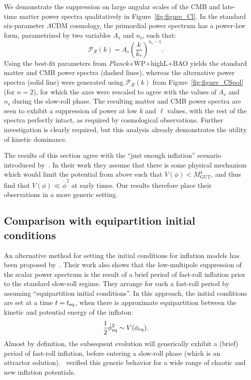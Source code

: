 We demonstrate the suppression on large angular scales of the CMB and late-time matter power spectra qualitatively in Figure~\ref{fig:figure_Cl}.  In the standard six-parameter \(\Lambda\)CDM cosmology, the primordial power spectrum has a power-law form, parametrized by two variables \(A_s\) and \(n_\mathrm{s}\), such that:
%
\begin{equation}
  \mathcal{P}_\mathcal{R}(k) = A_s{\left(\frac{k}{k_*}\right)}^{n_\mathrm{s}-1}.
\end{equation}
%
Using the best-fit parameters from {\em Planck\/}+WP+highL+BAO \citep{planck_collaboration_planck_2013} yields the standard matter and CMB power spectra (dashed lines), whereas the alternative power spectra (solid line) were generated using \(\mathcal{P}_\mathcal{R}(k)\) from Figure~\ref{fig:figure_CSpol} (for \(n=2\)), for which the axes were rescaled to agree with the values of \(A_s\) and \(n_\mathrm{s}\) during the slow-roll phase. The resulting matter and CMB power spectra are seen to exhibit a suppression of power at low \(k\) and \(\ell\) values, with the rest of the spectra perfectly intact, as required by cosmological observations.  Further investigation is clearly required, but this analysis already demonstrates the utility of kinetic dominance.

The results of this section agree with the ``just enough inflation'' scenario introduced by~\cite{Ramirez_excluded_2009,Ramirez_predictions_2012,Ramirez_low_2012}.  In their work they assume that there is some physical mechanism which would limit the potential from above such that \(V(\phi)<M_\mathrm{GUT}^4\), and thus find that \(V(\phi)\ll\dot{\phi}^2\) at early times. Our results therefore place their observations in a more generic setting.


\subsection{Comparison with equipartition initial conditions}
\label{sec:comparison}

An alternative method for setting the initial conditions for inflation models has been proposed by~\cite{boyanovsky_cmb_2006}. Their work also shows that the low-multipole suppression of the scalar power spectrum is the result of a brief period of fast-roll inflation prior to the standard slow-roll regime. They arrange for such a fast-roll period by assuming ``equipartition initial conditions''. In this approach, the initial conditions are set at a time \(t=t_{\mathrm{eq}}\), when there is approximate equipartition between the kinetic and potential energy of the inflaton:
%
\begin{equation}
  \frac{1}{2}\dot{\phi}_{\mathrm{eq}}^2 \sim V(\phi_{\mathrm{eq}}).
  \label{eqn:bvsbc}
\end{equation}
%
Almost by definition, the subsequent evolution will generically exhibit a (brief) period of fast-roll inflation, before entering a slow-roll phase (which is an attractor solution).~\cite{boyanovsky_cmb_2006} verified this generic behavior for a wide range of chaotic and new inflation potentials.

